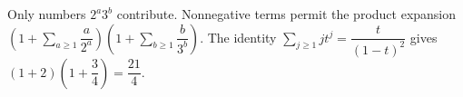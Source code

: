 Only numbers $2^a3^b$ contribute. Nonnegative terms permit the product expansion $\left(1+\sum_{a\ge1}\dfrac{a}{2^a}\right)\left(1+\sum_{b\ge1}\dfrac{b}{3^b}\right)$. The identity $\sum_{j\ge1}jt^j=\dfrac{t}{(1-t)^2}$ gives $(1+2)(1+\dfrac{3}{4})=\boxed{\dfrac{21}{4}}$.

